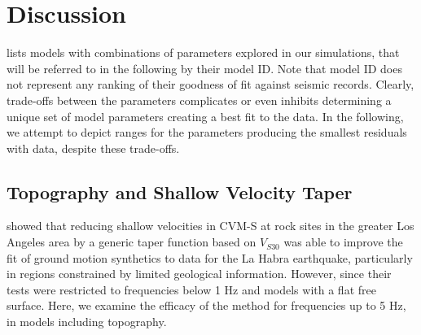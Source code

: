 \section{Discussion}
 lists models with combinations of parameters explored in our simulations, that will be referred to in the following by their model ID. Note that model ID does not represent any ranking of their goodness of fit against seismic records. Clearly, trade-offs between the parameters complicates or even inhibits determining a unique set of model parameters creating a best fit to the data. In the following, we attempt to depict ranges for the parameters producing the smallest residuals with data, despite these trade-offs.

\subsection{Topography and Shallow Velocity Taper}\label{highf:topoandtaper}
\citet{huCalibrationNearsurfaceSeismic2021} showed that reducing shallow velocities in CVM-S at rock sites in the greater Los Angeles area by a generic taper function based on $V_{S30}$ was able to improve the fit of ground motion synthetics to data for the La Habra earthquake, particularly in regions constrained by limited geological information.
However, since their tests were restricted to frequencies below 1 Hz and models with a flat free surface. Here, we examine the efficacy of the method for frequencies up to 5 Hz, in models including topography.

